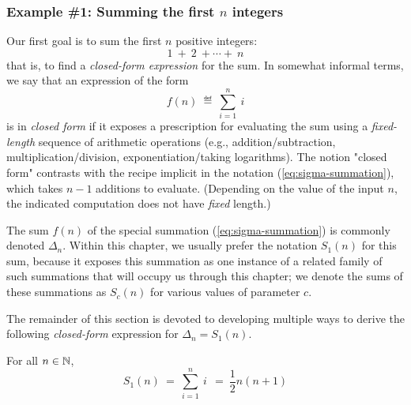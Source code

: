 \subsubsection{Example \#1: Summing the first $n$ integers}
\label{sec:special-arithmetic sums}

Our first goal is to sum the first $n$ positive integers:
\[ 1 \ + \ 2 \ + \cdots + \ n \]
that is, to find a {\it closed-form expression} 
for the sum.  In somewhat informal terms, we say that an expression of
the form
\begin{equation}
\label{eq:sigma-summation}
f(n) \ \eqdef \ \sum_{i=1}^n \ i
\end{equation}
is in {\it closed form} if it exposes a prescription for evaluating
the sum using a {\em fixed-length} sequence of arithmetic operations
(e.g., addition/subtraction, multiplication/division,
exponentiation/taking logarithms).  The notion "closed form" contrasts with the recipe implicit in the notation
(\ref{eq:sigma-summation}), which takes $n-1$ additions to evaluate.  (Depending on the value of 
the input $n$, the indicated computation does not have {\em fixed} length.) 

The sum $f(n)$ of the special summation  (\ref{eq:sigma-summation}) is commonly denoted $\Delta_n$.
Within this chapter, we usually prefer the notation $S_1(n)$ for this sum, because it
exposes this summation as one instance of a related family of such
summations that will occupy us through this chapter; we denote the sums of these summations as $S_c(n)$ for various
values of parameter $c$.

The remainder of this section is devoted to developing multiple ways
to derive the following {\em closed-form} expression for $\Delta_n = S_1(n)$.

\begin{prop}
\label{thm:sum-first-integers-Gauss}
For all $n \in \mathbb{N}$,
\begin{equation}
\label{eq:sum-1-to-n}
S_1(n) \ = \ \sum_{i=1}^n \ i \
  \ = \  \frac{1}{2} n (n+1) 
\end{equation}
\end{prop}


